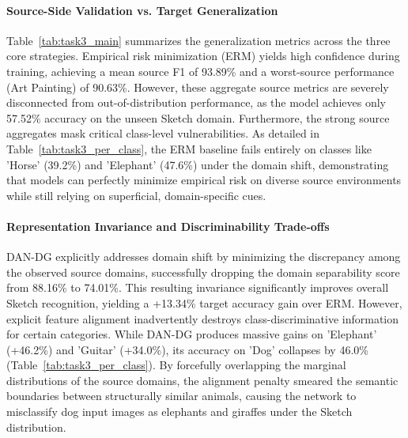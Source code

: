 \documentclass{article}
\begin{document}
\paragraph{Source-Side Validation vs. Target Generalization}
Table~\ref{tab:task3_main} summarizes the generalization metrics across the three core strategies. Empirical risk minimization (ERM) yields high confidence during training, achieving a mean source F1 of 93.89\% and a worst-source performance (Art Painting) of 90.63\%. However, these aggregate source metrics are severely disconnected from out-of-distribution performance, as the model achieves only 57.52\% accuracy on the unseen Sketch domain. Furthermore, the strong source aggregates mask critical class-level vulnerabilities. As detailed in Table~\ref{tab:task3_per_class}, the ERM baseline fails entirely on classes like 'Horse' (39.2\%) and 'Elephant' (47.6\%) under the domain shift, demonstrating that models can perfectly minimize empirical risk on diverse source environments while still relying on superficial, domain-specific cues.

\paragraph{Representation Invariance and Discriminability Trade-offs}
DAN-DG explicitly addresses domain shift by minimizing the discrepancy among the observed source domains, successfully dropping the domain separability score from 88.16\% to 74.01\%. This resulting invariance significantly improves overall Sketch recognition, yielding a +13.34\% target accuracy gain over ERM. However, explicit feature alignment inadvertently destroys class-discriminative information for certain categories. While DAN-DG produces massive gains on 'Elephant' (+46.2\%) and 'Guitar' (+34.0\%), its accuracy on 'Dog' collapses by 46.0\% (Table~\ref{tab:task3_per_class}). By forcefully overlapping the marginal distributions of the source domains, the alignment penalty smeared the semantic boundaries between structurally similar animals, causing the network to misclassify dog input images as elephants and giraffes under the Sketch distribution.
\end{document}
